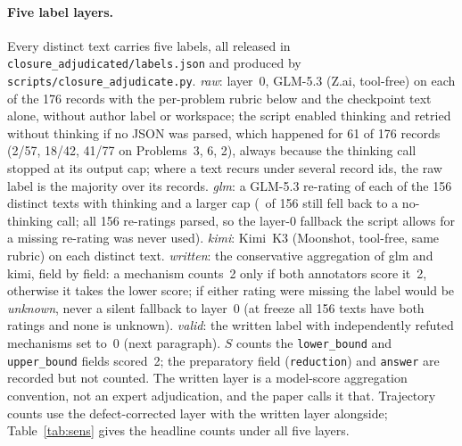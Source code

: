 \paragraph{Five label layers.} Every distinct text carries five labels, all released in \texttt{closure\_adjudicated/\allowbreak labels.json} and produced by \texttt{scripts/\allowbreak closure\_adjudicate.py}. \emph{raw}: layer~0, GLM-5.3 (Z.ai, tool-free) on each of the 176 records with the per-problem rubric below and the checkpoint text alone, without author label or workspace; the script enabled thinking and retried without thinking if no JSON was parsed, which happened for 61 of 176 records (2/57, 18/42, 41/77 on Problems~3, 6, 2), always because the thinking call stopped at its output cap; where a text recurs under several record ids, the raw label is the majority over its records. \emph{glm}: a GLM-5.3 re-rating of each of the 156 distinct texts with thinking and a larger cap (\RERUNFB\ of 156 still fell back to a no-thinking call; all 156 re-ratings parsed, so the layer-0 fallback the script allows for a missing re-rating was never used). \emph{kimi}: Kimi~K3 (Moonshot, tool-free, same rubric) on each distinct text. \emph{written}: the conservative aggregation of glm and kimi, field by field: a mechanism counts~2 only if both annotators score it~2, otherwise it takes the lower score; if either rating were missing the label would be \emph{unknown}, never a silent fallback to layer~0 (at freeze all 156 texts have both ratings and none is unknown). \emph{valid}: the written label with independently refuted mechanisms set to~0 (next paragraph). $S$ counts the \texttt{lower\_bound} and \texttt{upper\_bound} fields scored~2; the preparatory field (\texttt{reduction}) and \texttt{answer} are recorded but not counted. The written layer is a model-score aggregation convention, not an expert adjudication, and the paper calls it that. Trajectory counts use the defect-corrected layer with the written layer alongside; Table~\ref{tab:sens} gives the headline counts under all five layers.

